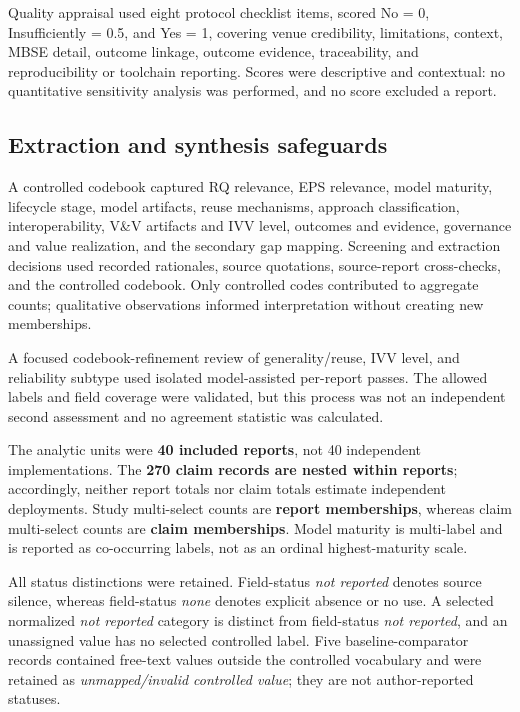 \documentclass[alpha-refs]{wiley-article}
\begin{document}
Quality appraisal used eight protocol checklist items, scored No = 0, Insufficiently = 0.5, and Yes = 1, covering venue credibility, limitations, context, MBSE detail, outcome linkage, outcome evidence, traceability, and reproducibility or toolchain reporting.  Scores were descriptive and contextual: no quantitative sensitivity analysis was performed, and no score excluded a report.

\subsection{Extraction and synthesis safeguards}
A controlled codebook captured RQ relevance, EPS relevance, model maturity, lifecycle stage, model artifacts, reuse mechanisms, approach classification, interoperability, V\&V artifacts and IVV level, outcomes and evidence, governance and value realization, and the secondary gap mapping.  Screening and extraction decisions used recorded rationales, source quotations, source-report cross-checks, and the controlled codebook.  Only controlled codes contributed to aggregate counts; qualitative observations informed interpretation without creating new memberships.

A focused codebook-refinement review of generality/reuse, IVV level, and reliability subtype used isolated model-assisted per-report passes.  The allowed labels and field coverage were validated, but this process was not an independent second assessment and no agreement statistic was calculated.

The analytic units were \textbf{40 included reports}, not 40 independent implementations.  The \textbf{270 claim records are nested within reports}; accordingly, neither report totals nor claim totals estimate independent deployments.  Study multi-select counts are \textbf{report memberships}, whereas claim multi-select counts are \textbf{claim memberships}.  Model maturity is multi-label and is reported as co-occurring labels, not as an ordinal highest-maturity scale.

All status distinctions were retained.  Field-status \emph{not reported} denotes source silence, whereas field-status \emph{none} denotes explicit absence or no use.  A selected normalized \emph{not reported} category is distinct from field-status \emph{not reported}, and an unassigned value has no selected controlled label.  Five baseline-comparator records contained free-text values outside the controlled vocabulary and were retained as \emph{unmapped/invalid controlled value}; they are not author-reported statuses.
\end{document}
